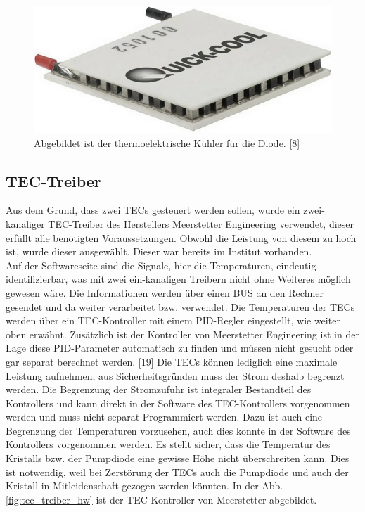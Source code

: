 \begin{figure}[H]
    \centering
    \includegraphics[scale=0.5]{98_images/peltier_modul.PNG}
    \caption{Abgebildet ist der thermoelektrische Kühler für die Diode. [8]}
    \label{fig:tec_di_hw}
\end{figure}

\subsection{TEC-Treiber}
\label{label_tec_treiber}
Aus dem Grund, dass zwei TECs gesteuert werden sollen, wurde ein zwei-kanaliger TEC-Treiber des Herstellers Meerstetter Engineering verwendet, dieser erfüllt alle benötigten Voraussetzungen. Obwohl die Leistung von diesem zu hoch ist, wurde dieser ausgewählt. Dieser war bereits im Institut vorhanden.\\
Auf der Softwareseite sind die Signale, hier die Temperaturen, eindeutig identifizierbar, was mit zwei ein-kanaligen Treibern nicht ohne Weiteres möglich gewesen wäre. Die Informationen werden über einen BUS an den Rechner gesendet und da weiter verarbeitet bzw. verwendet.
Die Temperaturen der TECs werden über ein TEC-Kontroller mit einem PID-Regler eingestellt, wie weiter oben erwähnt. Zusätzlich ist der Kontroller von Meerstetter Engineering ist in der Lage diese PID-Parameter automatisch zu finden und müssen nicht gesucht oder gar separat berechnet werden. [19]
Die TECs können lediglich eine maximale Leistung aufnehmen, aus Sicherheitsgründen muss der Strom deshalb begrenzt werden. Die Begrenzung der Stromzufuhr ist integraler Bestandteil des Kontrollers und kann direkt in der Software des TEC-Kontrollers vorgenommen werden und muss nicht separat Programmiert werden. Dazu ist auch eine Begrenzung der Temperaturen vorzusehen, auch dies konnte in der Software des Kontrollers vorgenommen werden. Es stellt sicher, dass die Temperatur des Kristalls bzw. der Pumpdiode eine gewisse Höhe nicht überschreiten kann. Dies ist notwendig, weil bei Zerstörung der TECs auch die Pumpdiode und auch der Kristall in Mitleidenschaft gezogen werden könnten. In der Abb. \ref{fig:tec_treiber_hw} ist der TEC-Kontroller von Meerstetter abgebildet.\\

